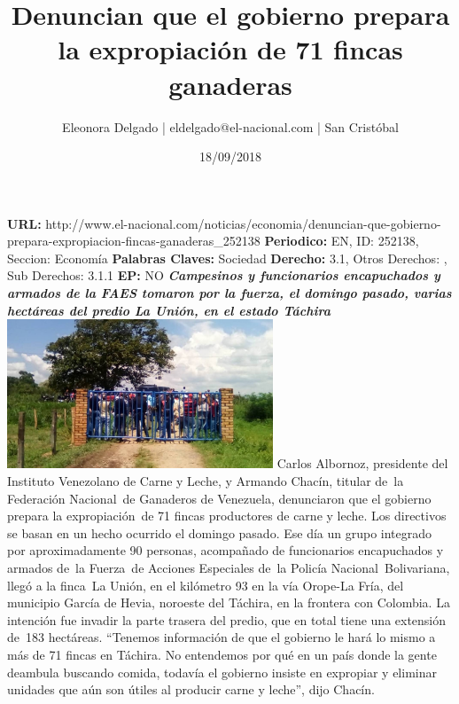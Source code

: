 \documentclass{article}%
\title{\textbf{Denuncian que el gobierno prepara la expropiación de 71 fincas ganaderas}}%
\author{Eleonora Delgado | eldelgado@el{-}nacional.com | San Cristóbal}%
\date{18/09/2018}%
\begin{document}
%
\normalsize%
\maketitle%
\textbf{URL: }%
http://www.el{-}nacional.com/noticias/economia/denuncian{-}que{-}gobierno{-}prepara{-}expropiacion{-}fincas{-}ganaderas\_252138\newline%
%
\textbf{Periodico: }%
EN, %
ID: %
252138, %
Seccion: %
Economía\newline%
%
\textbf{Palabras Claves: }%
Sociedad\newline%
%
\textbf{Derecho: }%
3.1, %
Otros Derechos: %
, %
Sub Derechos: %
3.1.1\newline%
%
\textbf{EP: }%
NO\newline%
\newline%
%
\textbf{\textit{Campesinos y funcionarios encapuchados y armados de la FAES tomaron por la fuerza, el domingo pasado, varias hectáreas del predio La Unión, en el estado Táchira ~}}%
\newline%
\newline%
%
\includegraphics[width=300px]{254.jpg}%
\newline%
%
Carlos Albornoz, presidente del Instituto Venezolano de Carne y Leche, y Armando Chacín, titular de~la Federación Nacional~de Ganaderos de Venezuela, denunciaron que el gobierno prepara la expropiación~de 71 fincas productores de carne y leche.%
\newline%
%
Los directivos se basan en un hecho ocurrido el domingo pasado. Ese día un grupo integrado por aproximadamente 90 personas, acompañado de funcionarios encapuchados y armados de~la Fuerza~de Acciones Especiales de~la Policía Nacional~Bolivariana, llegó a la finca~La Unión, en el kilómetro 93 en la vía Orope{-}La Fría, del municipio García de Hevia, noroeste del Táchira, en la frontera con Colombia. La intención fue invadir la parte trasera del predio, que en total tiene una extensión de~183 hectáreas.%
\newline%
%
“Tenemos información de que el gobierno le hará lo mismo a más de 71 fincas en Táchira. No entendemos por qué en un país donde la gente deambula buscando comida, todavía el gobierno insiste en expropiar y eliminar unidades que aún son útiles al producir carne y leche”, dijo Chacín.%
\end{document}
